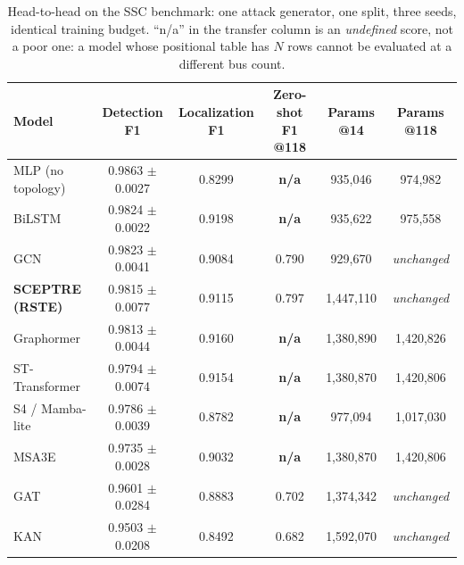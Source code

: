 \begin{table}[!t]
\caption{Head-to-head on the SSC benchmark: one attack generator, one split,
three seeds, identical training budget. ``n/a'' in the transfer column is an
\emph{undefined} score, not a poor one: a model whose positional table has $N$
rows cannot be evaluated at a different bus count.}
\label{tab:headtohead}
\centering
\begin{tabular}{@{}lccccc@{}}
\toprule
Model & Detection F1 & Localization F1 & Zero-shot F1 @118
  & Params @14 & Params @118 \\
\midrule
MLP (no topology) & 0.9863 $\pm$ 0.0027 & 0.8299 & \textbf{n/a} & 935,046 & 974,982 \\
BiLSTM & 0.9824 $\pm$ 0.0022 & 0.9198 & \textbf{n/a} & 935,622 & 975,558 \\
GCN & 0.9823 $\pm$ 0.0041 & 0.9084 & 0.790 & 929,670 & \textit{unchanged} \\
\textbf{SCEPTRE (RSTE)} & 0.9815 $\pm$ 0.0077 & 0.9115 & 0.797 & 1,447,110 & \textit{unchanged} \\
Graphormer & 0.9813 $\pm$ 0.0044 & 0.9160 & \textbf{n/a} & 1,380,890 & 1,420,826 \\
ST-Transformer \cite{sttrans2023} & 0.9794 $\pm$ 0.0074 & 0.9154 & \textbf{n/a} & 1,380,870 & 1,420,806 \\
S4 / Mamba-lite & 0.9786 $\pm$ 0.0039 & 0.8782 & \textbf{n/a} & 977,094 & 1,017,030 \\
MSA3E \cite{cui2025} & 0.9735 $\pm$ 0.0028 & 0.9032 & \textbf{n/a} & 1,380,870 & 1,420,806 \\
GAT & 0.9601 $\pm$ 0.0284 & 0.8883 & 0.702 & 1,374,342 & \textit{unchanged} \\
KAN \cite{graphkan2025} & 0.9503 $\pm$ 0.0208 & 0.8492 & 0.682 & 1,592,070 & \textit{unchanged} \\
\bottomrule
\end{tabular}
\end{table}


